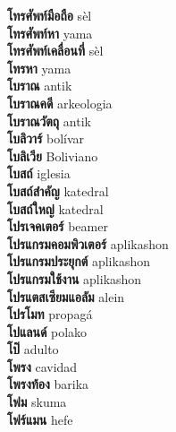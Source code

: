 \textbf{ โทรศัพท์มือถือ  } sèl \\
\textbf{ โทรศัพท์หา  } yama \\
\textbf{ โทรศัพท์เคลื่อนที่  } sèl \\
\textbf{ โทรหา  } yama \\
\textbf{ โบราณ  } antik \\
\textbf{ โบราณคดี  } arkeologia \\
\textbf{ โบราณวัตถุ  } antik \\
\textbf{ โบลิวาร์  } bolívar \\
\textbf{ โบลิเวีย  } Boliviano \\
\textbf{ โบสถ์  } iglesia \\
\textbf{ โบสถ์สำคัญ  } katedral \\
\textbf{ โบสถ์ใหญ่  } katedral \\
\textbf{ โปรเจคเตอร์  } beamer \\
\textbf{ โปรแกรมคอมพิวเตอร์  } aplikashon \\
\textbf{ โปรแกรมประยุกต์  } aplikashon \\
\textbf{ โปรแกรมใช้งาน  } aplikashon \\
\textbf{ โปรแตสเซียมแอลัม  } alein \\
\textbf{ โปรโมท  } propagá \\
\textbf{ โปแลนด์  } polako \\
\textbf{ โป๊  } adulto \\
\textbf{ โพรง  } cavidad \\
\textbf{ โพรงท้อง  } barika \\
\textbf{ โฟม  } skuma \\
\textbf{ โฟร์แมน  } hefe \\
